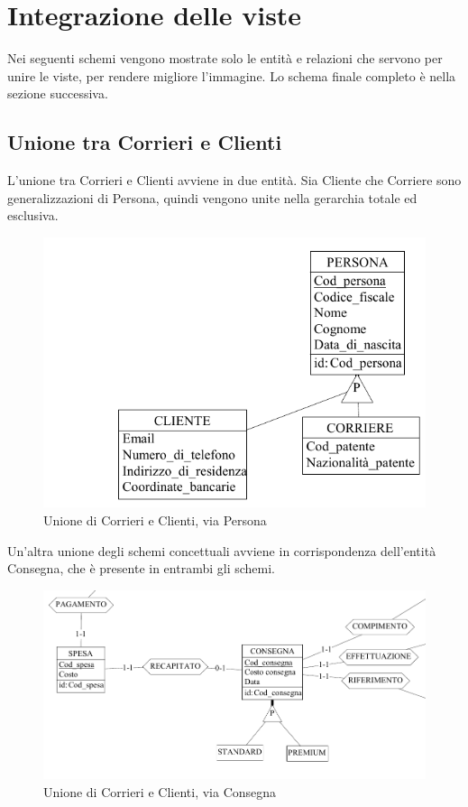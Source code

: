 \documentclass[a4paper,12pt]{report}
\begin{document}
\section{Integrazione delle viste}
Nei seguenti schemi vengono mostrate solo le entità e relazioni che servono per unire le viste, per rendere migliore l'immagine. Lo schema finale completo è nella sezione successiva.
\subsection{Unione tra Corrieri e Clienti}
L'unione tra Corrieri e Clienti avviene in due entità. Sia Cliente che Corriere sono generalizzazioni di Persona, quindi vengono unite nella gerarchia totale ed esclusiva.
\begin{figure}[H]
	\centering{}
	\includegraphics[width=\textwidth]{img/Unione-Clienti-Corrieri1.pdf}
	\caption{Unione di Corrieri e Clienti, via Persona}
\end{figure}
Un'altra unione degli schemi concettuali avviene in corrispondenza dell'entità Consegna, che è presente in entrambi gli schemi. 
\begin{figure}[H]
	\centering{}
	\includegraphics[width=\textwidth]{img/Unione-Clienti-Corrieri2.pdf}
	\caption{Unione di Corrieri e Clienti, via Consegna}
\end{figure}
\end{document}
